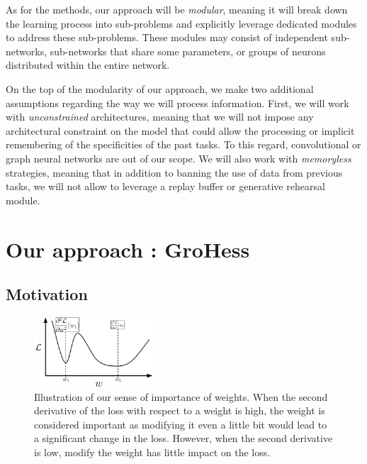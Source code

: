 \documentclass[11pt]{article}
\begin{document}
\vspace{2mm}
\noindent
As for the methods, our approach will be \textit{modular}, meaning it will break down the learning process into sub-problems and explicitly leverage dedicated modules to address these sub-problems. These modules may consist of independent sub-networks, sub-networks that share some parameters, or groups of neurons distributed within the entire network.

\vspace{2mm}
\noindent
On the top of the modularity of our approach, we make two additional assumptions regarding the way we will process information. First, we will work with \textit{unconstrained} architectures, meaning that we will not impose any architectural constraint on the model that could allow the processing or implicit remembering of the specificities of the past tasks. To this regard, convolutional or graph neural networks are out of our scope. We will also work with \textit{memoryless} strategies, meaning that in addition to banning the use of data from previous tasks, we will not allow to leverage a replay buffer or generative rehearsal module.




\section{Our approach : GroHess}



\subsection{Motivation}


\begin{figure}
    \centering
    \includegraphics[width=0.40\textwidth]{images/motivation_GroHess.png}
    \caption{Illustration of our sense of importance of weights. When the second derivative of the loss with respect to a weight is high, the weight is considered important as modifying it even a little bit would lead to a significant change in the loss. However, when the second derivative is low, modify the weight has little impact on the loss.}
    \label{fig:motivation_GroHess}
\end{figure}
\end{document}
